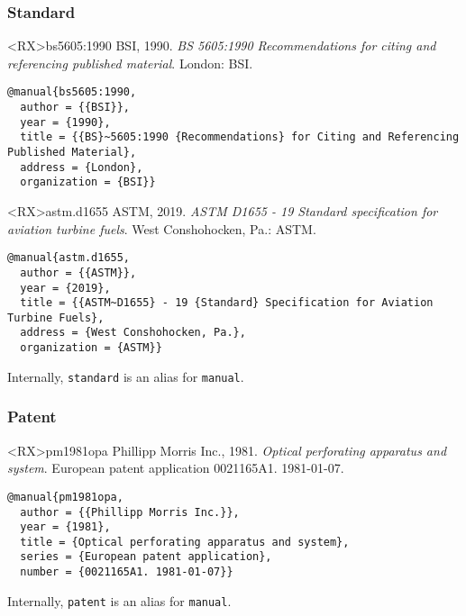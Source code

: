 \documentclass[10pt,a4paper]{article}
\newenvironment{info}{%
  \begin{list}{\makebox[2em][c]{\faInfoCircle}}{%
    \setlength{\leftmargin}{2em}
    \setlength{\labelwidth}{2em}
    \setlength{\labelsep}{0pt}}
}{\end{list}}
\begin{document}
\subsubsection*{Standard}

\begin{bibexbox}<RX>{bs5605:1990}
  BSI, 1990. \emph{BS 5605:1990 Recommendations for citing and referencing
  published material}. London: BSI.
  \tcblower
\begin{Verbatim}
@manual{bs5605:1990,
  author = {{BSI}},
  year = {1990},
  title = {{BS}~5605:1990 {Recommendations} for Citing and Referencing Published Material},
  address = {London},
  organization = {BSI}}
\end{Verbatim}
\end{bibexbox}

\begin{bibexbox}<RX>{astm.d1655}
  ASTM, 2019. \emph{ASTM D1655 - 19 Standard specification for aviation
  turbine fuels}. West Conshohocken, Pa.: ASTM.
  \tcblower
\begin{Verbatim}
@manual{astm.d1655,
  author = {{ASTM}},
  year = {2019},
  title = {{ASTM~D1655} - 19 {Standard} Specification for Aviation Turbine Fuels},
  address = {West Conshohocken, Pa.},
  organization = {ASTM}}
\end{Verbatim}
\end{bibexbox}

\begin{info}\item Internally, \texttt{standard} is an alias for \texttt{manual}.\end{info}

\subsubsection*{Patent}

\begin{bibexbox}<RX>{pm1981opa}
  Phillipp Morris Inc., 1981. \emph{Optical perforating apparatus and system}. European patent application 0021165A1. 1981-01-07.
  \tcblower
\begin{Verbatim}
@manual{pm1981opa,
  author = {{Phillipp Morris Inc.}},
  year = {1981},
  title = {Optical perforating apparatus and system},
  series = {European patent application},
  number = {0021165A1. 1981-01-07}}
\end{Verbatim}
\end{bibexbox}

\begin{info}\item
Internally, \texttt{patent} is an alias for \texttt{manual}.
\end{info}
\end{document}
